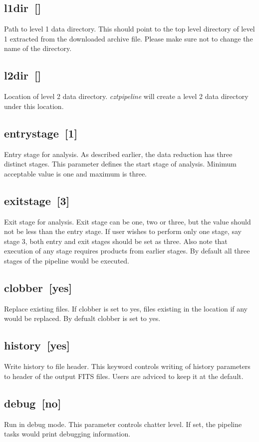 \documentclass[11pt,oneside,a4paper]{article}
\begin{document}
\subsection*{l1dir~[]}
    Path to level 1 data directory. This should point to the top level directory 
of level 1 extracted from the downloaded archive file. Please make sure not to change the 
name of the directory.
\subsection*{l2dir~[]}
    Location of level 2 data directory. \emph{cztpipeline} will create a level 2 
data directory under this location.
\subsection*{entrystage~[1]}
    Entry stage for analysis. As described earlier, the data reduction has 
three distinct stages. This parameter defines the start stage of analysis. 
Minimum acceptable value is one and maximum is three.
\subsection*{exitstage~[3]}
    Exit stage for analysis. Exit stage can be one, two or three, but the value 
should not be less than the entry stage. If user wishes to perform only one stage, 
say stage 3, both entry and exit stages should be set as three. Also note that 
execution of any stage requires products from earlier stages.
By default all three stages of the pipeline would be executed. 
\subsection*{clobber~[yes]}
    Replace existing files. If clobber is set to yes, files existing in the 
location if any would be replaced. By defualt clobber is set to yes. 
\subsection*{history~[yes]}
    Write history to file header. This keyword controls writing of history parameters 
to header of the output FITS files. Users are adviced to keep it at the default.
\subsection*{debug~[no]}
    Run in debug mode. This parameter controls chatter level. If set, the pipeline 
tasks would print debugging information.
\end{document}
